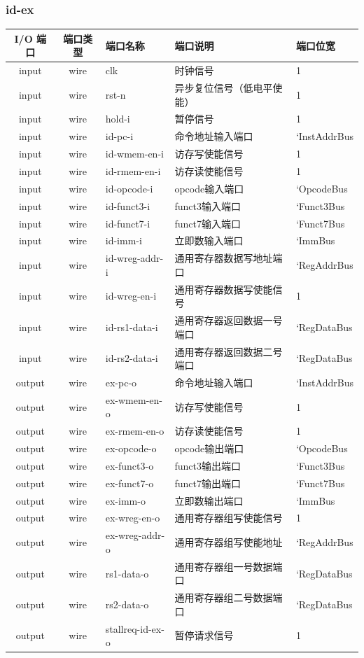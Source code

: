 \documentclass[lang=cn,11pt,a4paper]{elegantpaper}
\begin{document}
\subsubsection{id-ex}
\begin{tabular}{cclll}
	\toprule
	I/O 端口 & 端口类型 &端口名称&端口说明 &端口位宽\\
	\midrule
	input &wire& clk & 时钟信号 & 1 \\
	input &wire& rst-n & 异步复位信号（低电平使能） & 1 \\
	input &wire& hold-i & 暂停信号       & 1   \\
	
	input &wire& id-pc-i & 命令地址输入端口       & `InstAddrBus  \\
	input &wire& id-wmem-en-i & 访存写使能信号 & 1 \\
	input &wire& id-rmem-en-i & 访存读使能信号 & 1 \\
	input &wire& id-opcode-i & opcode输入端口    & `OpcodeBus   \\
	input &wire& id-funct3-i & funct3输入端口    & `Funct3Bus   \\
	input &wire& id-funct7-i & funct7输入端口    & `Funct7Bus   \\
	input &wire& id-imm-i & 立即数输入端口    & `ImmBus   \\
	
	input &wire& id-wreg-addr-i & 通用寄存器数据写地址端口 & `RegAddrBus \\
	input &wire& id-wreg-en-i & 通用寄存器数据写使能信号 & 1  \\
	input &wire& id-rs1-data-i  & 通用寄存器返回数据一号端口 & `RegDataBus  \\
	input &wire& id-rs2-data-i  & 通用寄存器返回数据二号端口 & `RegDataBus  \\
	
	output &wire& ex-pc-o & 命令地址输入端口       & `InstAddrBus  \\
	output &wire& ex-wmem-en-o & 访存写使能信号 & 1 \\
	output &wire& ex-rmem-en-o & 访存读使能信号 & 1 \\
	output &wire& ex-opcode-o & opcode输出端口    & `OpcodeBus   \\
	output &wire& ex-funct3-o & funct3输出端口    & `Funct3Bus   \\
	output &wire& ex-funct7-o & funct7输出端口    & `Funct7Bus   \\
	output &wire& ex-imm-o & 立即数输出端口    & `ImmBus   \\
	output &wire& ex-wreg-en-o & 通用寄存器组写使能信号    & 1   \\
	output &wire& ex-wreg-addr-o & 通用寄存器组写使能地址    & `RegAddrBus  \\
	output &wire& rs1-data-o& 通用寄存器组一号数据端口    & `RegDataBus  \\
	output &wire& rs2-data-o& 通用寄存器组二号数据端口    & `RegDataBus  \\
	output &wire& stallreq-id-ex-o& 暂停请求信号    & 1 \\
	\bottomrule
\end{tabular}\\
\end{document}
